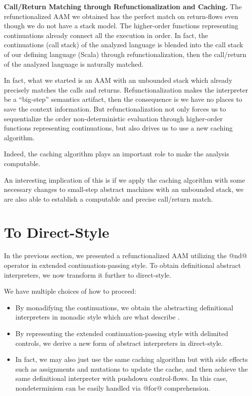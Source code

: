 \documentclass[acmsmall]{acmart}\settopmatter{}
\begin{document}
\textbf{Call/Return Matching through Refunctionalization and Caching.}
The refunctionalized AAM we obtained has the perfect match on return-flows even though 
we do not have a stack model. The higher-order functions representing continuations 
already connect all the execution in order. In fact, the continuations (call stack) 
of the analyzed language is blended into the call stack of our defining language 
(Scala) through refunctionalization, then the call/return of the analyzed language 
is naturally matched.

In fact, what we started is an AAM with an unbounded stack which already precisely 
matches the calls and returns.
Refunctionalization makes the interpreter be a ``big-step'' semantics artifact, 
then the consequence is we have no places to save the context information. 
But refunctionalization not only forces us to sequentialize the order non-deterministic 
evaluation through higher-order functions representing continuations, 
but also drives us to use a new caching algorithm.  

Indeed, the caching algorithm plays an important role to make the analysis computable. 

An interesting implication of this is if we apply the caching algorithm with some 
necessary changes to small-step abstract machines with an unbounded stack, 
we are also able to establish a computable and precise call/return match.

\section{To Direct-Style} \label{directstyle}

In the previous section, we presented a refunctionalized AAM utilizing the @nd@ operator
in extended continuation-passing style.
To obtain definitional abstract interpreters, we now transform it further to direct-style.

We have multiple choices of how to proceed:
\begin{itemize}
  \item By monadifying the continuations, we obtain the abstracting
    definitional interpreters in monadic style which are what \citeauthor{darais2017abstracting}
    describe \cite{darais2017abstracting}.
  \item By representing the extended continuation-passing style with delimited controls,
    we derive a new form of abstract interpreters in direct-style.
  \item In fact, we may also just use the same caching algorithm but with side effects such as
    assignments and mutations to update the cache, and then achieve the same
    definitional interpreter with pushdown control-flows. In this case, nondeterminism can be
    easily handled via @for@ comprehension.
\end{itemize}
\end{document}
